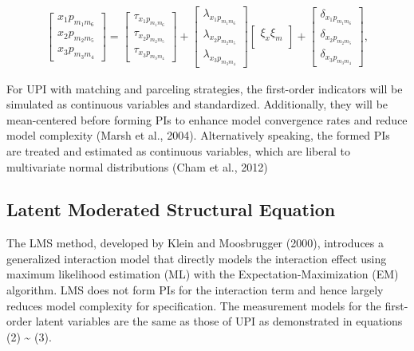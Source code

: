 \documentclass[
  man]{apa7}
\begin{document}
\begin{align}
    \begin{bmatrix}
        x_{1}p_{m_{1}m_{6}} \\
        x_{2}p_{m_{2}m_{5}} \\ 
        x_{3}p_{m_{3}m_{4}}
    \end{bmatrix} =
    \begin{bmatrix}
        \tau_{x_{1}p_{m_{1}m_{6}}} \\
        \tau_{x_{2}p_{m_{2}m_{5}}} \\ 
        \tau_{x_{3}p_{m_{3}m_{4}}}
    \end{bmatrix} +
    \begin{bmatrix}
        \lambda_{x_{1}p_{m_{1}m_{6}}} \\
        \lambda_{x_{2}p_{m_{2}m_{5}}} \\ 
        \lambda_{x_{3}p_{m_{3}m_{4}}}
    \end{bmatrix}
    \begin{bmatrix}
        \xi_{x}\xi_{m} \\
    \end{bmatrix} +
    \begin{bmatrix}
        \delta_{x_{1}p_{m_{1}m_{6}}} \\
        \delta_{x_{2}p_{m_{2}m_{5}}} \\ 
        \delta_{x_{3}p_{m_{3}m_{4}}}
    \end{bmatrix},
\end{align}

For UPI with matching and parceling strategies, the first-order indicators will be simulated as continuous variables and standardized. Additionally, they will be mean-centered before forming PIs to enhance model convergence rates and reduce model complexity (Marsh et al., 2004). Alternatively speaking, the formed PIs are treated and estimated as continuous variables, which are liberal to multivariate normal distributions (Cham et al., 2012)

\hypertarget{latent-moderated-structural-equation}{%
\subsection{Latent Moderated Structural Equation}\label{latent-moderated-structural-equation}}

The LMS method, developed by Klein and Moosbrugger (2000), introduces a generalized interaction model that directly models the interaction effect using maximum likelihood estimation (ML) with the Expectation-Maximization (EM) algorithm. LMS does not form PIs for the interaction term and hence largely reduces model complexity for specification. The measurement models for the first-order latent variables are the same as those of UPI as demonstrated in equations (2) \textasciitilde{} (3).
\end{document}
